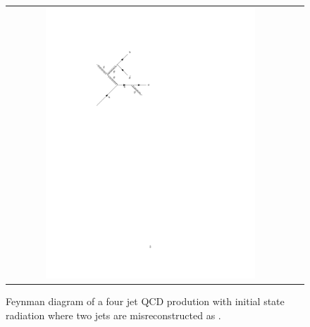 \begin{figure}[tbh!]
	\centering
	\begin{tabular}{cc}
		\includegraphics[width=0.75\textwidth]{diagrams/pics/background_QCDinitrad.pdf}
	\end{tabular}
	\caption{Feynman diagram of a four jet QCD prodution with initial state radiation where two jets are misreconstructed as \hadtau. }
	\label{fig:background_QCDinitrad}
\end{figure}

